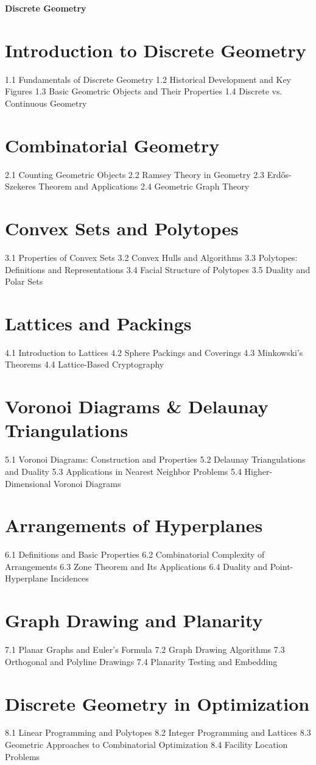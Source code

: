 {\LARGE \bf{Discrete Geometry}}
\section{ Introduction to Discrete Geometry}
1.1 Fundamentals of Discrete Geometry
1.2 Historical Development and Key Figures
1.3 Basic Geometric Objects and Their Properties
1.4 Discrete vs. Continuous Geometry
\section{Combinatorial Geometry}
2.1 Counting Geometric Objects
2.2 Ramsey Theory in Geometry
2.3 Erdős-Szekeres Theorem and Applications
2.4 Geometric Graph Theory
\section{Convex Sets and Polytopes}
3.1 Properties of Convex Sets
3.2 Convex Hulls and Algorithms
3.3 Polytopes: Definitions and Representations
3.4 Facial Structure of Polytopes
3.5 Duality and Polar Sets
\section{Lattices and Packings}
4.1 Introduction to Lattices
4.2 Sphere Packings and Coverings
4.3 Minkowski's Theorems
4.4 Lattice-Based Cryptography
\section{Voronoi Diagrams \& Delaunay Triangulations}
5.1 Voronoi Diagrams: Construction and Properties
5.2 Delaunay Triangulations and Duality
5.3 Applications in Nearest Neighbor Problems
5.4 Higher-Dimensional Voronoi Diagrams
\section{Arrangements of Hyperplanes}
6.1 Definitions and Basic Properties
6.2 Combinatorial Complexity of Arrangements
6.3 Zone Theorem and Its Applications
6.4 Duality and Point-Hyperplane Incidences
\section{Graph Drawing and Planarity}
7.1 Planar Graphs and Euler's Formula
7.2 Graph Drawing Algorithms
7.3 Orthogonal and Polyline Drawings
7.4 Planarity Testing and Embedding
\section{Discrete Geometry in Optimization}
8.1 Linear Programming and Polytopes
8.2 Integer Programming and Lattices
8.3 Geometric Approaches to Combinatorial Optimization
8.4 Facility Location Problems
